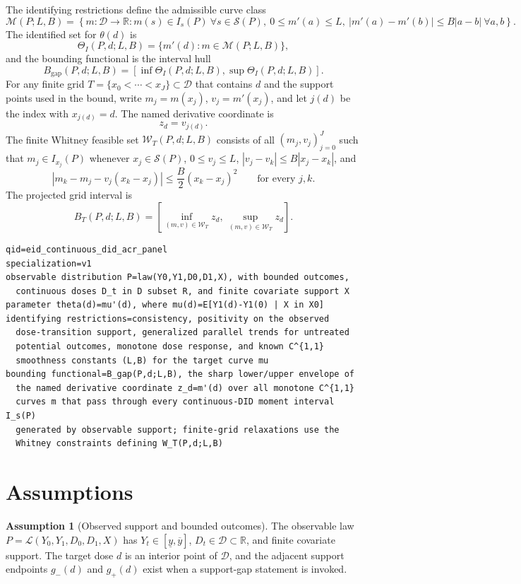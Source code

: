 \documentclass[11pt]{article}
\theoremstyle{definition}
\newtheorem{assumption}{Assumption}
\theoremstyle{plain}
\theoremstyle{remark}
\begin{document}
The identifying restrictions define the admissible curve class
\[
  \mathcal M(P;L,B)=
  \left\{m:\mathcal D\to\mathbb R:
  m(s)\in I_s(P)\ \forall s\in\mathcal S(P),\
  0\le m'(a)\le L,\
  |m'(a)-m'(b)|\le B|a-b|\ \forall a,b
  \right\}.
\]
The identified set for \(\theta(d)\) is
\[
  \Theta_I(P,d;L,B)=\{m'(d):m\in\mathcal M(P;L,B)\},
\]
and the bounding functional is the interval hull
\[
  B_{\mathrm{gap}}(P,d;L,B)=
  [\inf\Theta_I(P,d;L,B),\sup\Theta_I(P,d;L,B)].
\]
For any finite grid \(T=\{x_0<\cdots<x_J\}\subset\mathcal D\) that contains \(d\) and the support points used in the bound, write \(m_j=m(x_j)\), \(v_j=m'(x_j)\), and let \(j(d)\) be the index with \(x_{j(d)}=d\).  The named derivative coordinate is
\[
  z_d=v_{j(d)}.
\]
The finite Whitney feasible set \(\mathcal W_T(P,d;L,B)\) consists of all \((m_j,v_j)_{j=0}^J\) such that \(m_j\in I_{x_j}(P)\) whenever \(x_j\in\mathcal S(P)\), \(0\le v_j\le L\), \(|v_j-v_k|\le B|x_j-x_k|\), and
\[
  \left|m_k-m_j-v_j(x_k-x_j)\right|
  \le \frac{B}{2}(x_k-x_j)^2
  \qquad\text{for every }j,k.
\]
The projected grid interval is
\[
  B_T(P,d;L,B)=
  \left[\inf_{(m,v)\in\mathcal W_T} z_d,\,
        \sup_{(m,v)\in\mathcal W_T} z_d\right].
\]

\begin{verbatim}
qid=eid_continuous_did_acr_panel
specialization=v1
observable distribution P=law(Y0,Y1,D0,D1,X), with bounded outcomes,
  continuous doses D_t in D subset R, and finite covariate support X
parameter theta(d)=mu'(d), where mu(d)=E[Y1(d)-Y1(0) | X in X0]
identifying restrictions=consistency, positivity on the observed
  dose-transition support, generalized parallel trends for untreated
  potential outcomes, monotone dose response, and known C^{1,1}
  smoothness constants (L,B) for the target curve mu
bounding functional=B_gap(P,d;L,B), the sharp lower/upper envelope of
  the named derivative coordinate z_d=m'(d) over all monotone C^{1,1}
  curves m that pass through every continuous-DID moment interval I_s(P)
  generated by observable support; finite-grid relaxations use the
  Whitney constraints defining W_T(P,d;L,B)
\end{verbatim}

\section{Assumptions}
\begin{assumption}[Observed support and bounded outcomes]\label{ass:observed-support}
The observable law \(P=\mathcal L(Y_0,Y_1,D_0,D_1,X)\) has \(Y_t\in[\underline y,\overline y]\), \(D_t\in\mathcal D\subset\mathbb R\), and finite covariate support.  The target dose \(d\) is an interior point of \(\mathcal D\), and the adjacent support endpoints \(g_-(d)\) and \(g_+(d)\) exist when a support-gap statement is invoked.
\end{assumption}
\end{document}
